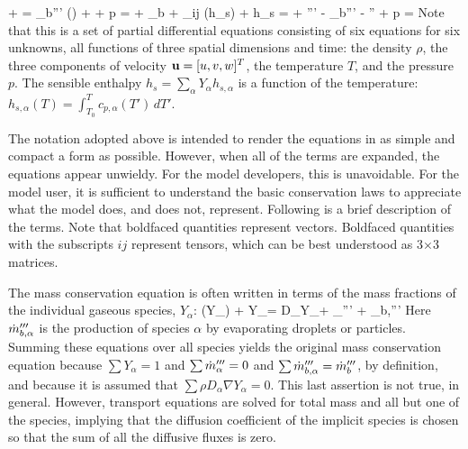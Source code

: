\documentclass[11pt]{book}
\begin{document}
\vspace{\baselineskip}
\be {} + \nabla \cdot \rho \bu  =  \dm_b'''  \label{mass} \ee
{}
\be {} (\rho \bu) + \nabla \cdot \rho \bu \bu
+ \nabla p = \rho \bg + \bof_b
+ \nabla \cdot \btau_{ij}   \label{momentum} \ee
{}
\be {}(\rho h_s) + \nabla \cdot \rho h_s \bu =   + \dq''' - \dq_b'''
        - \nabla \cdot \dbq'' + \epsilon \label{energy} \ee
{}
\be p =   \label{basicstate} \ee
Note that this is a set of partial differential equations consisting of
six equations for six unknowns, all functions of three spatial dimensions and time:
the density $\rho$, the three components
of velocity ${\bf u}=[u,v,w]^T$, the temperature $T$, and the pressure $p$.
The sensible enthalpy $h_s = \sum_\alpha Y_\alpha h_{s,\alpha}$ is a function of the temperature: $h_{s,\alpha}(T)=\int_{T_0}^T c_{p,\alpha}(T') \, dT'$.

The notation adopted above is intended to render the equations in as
simple and compact a form as possible. However, when all of the terms are expanded, the
equations appear unwieldy. For the model developers, this is unavoidable. For the model
user, it is sufficient to understand the basic conservation laws to appreciate what the
model does, and does not, represent. Following is a brief description of the
terms. Note that boldfaced quantities represent vectors. Boldfaced quantities with the subscripts $ij$
represent tensors, which can be best understood as 3$\times$3 matrices.

The mass conservation equation is often written in terms of the mass fractions of the individual gaseous species, $Y_\alpha$:
\be {}(\rho Y_\alpha) + \nabla \cdot \rho Y_\alpha \bu = \nabla \cdot \rho D_\alpha \nabla Y_\alpha + \dm_\alpha''' + \dm_{b,\alpha}'''  
\label{species} 
\ee
Here $\dot{m}_{b,\alpha}'''$ is the production of species $\alpha$ by evaporating droplets or particles. 
Summing these equations over all species yields the original mass conservation equation because
$\sum Y_\alpha=1$ and $\sum \dot{m}_\alpha''' = 0$ and $\sum
\dot{m}_{b,\alpha}'''=\dot{m}_b'''$, by definition, and because it is assumed
that $\sum \rho D_\alpha \nabla Y_\alpha = 0$. This last assertion is not true, in general. However, transport equations are solved for total 
mass and all but one of the species, implying that the diffusion coefficient of the implicit species is chosen so that the sum of all the 
diffusive fluxes is zero.
\end{document}
